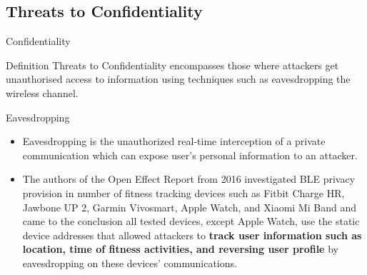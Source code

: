 \documentclass[ucs,9pt]{beamer}
\begin{document}
\subsection{Threats to Confidentiality}

\begin{frame}{Confidentiality}
	\begin{alertblock}{Definition}
	Threats to Confidentiality encompasses those where attackers get unauthorised  access to information using techniques such as eavesdropping  the wireless channel.	
	\end{alertblock}
	
	
	
\end{frame}

\begin{frame}{Eavesdropping}
	\begin{itemize}
		\item Eavesdropping is the unauthorized real-time interception of a private communication which can expose user’s personal information to an attacker.
		\item The authors of the Open Effect Report from 2016 \cite{b7} investigated BLE privacy provision in number of fitness tracking devices such as Fitbit Charge HR, Jawbone UP 2, Garmin Vivosmart, 	Apple Watch, and Xiaomi Mi Band and came to the conclusion all tested devices, except Apple Watch, use the static device addresses that allowed attackers to \textbf{track user information such as location, time of fitness activities, and reversing user profile} by eavesdropping on these devices’ communications.
	\end{itemize}
\end{frame}
\end{document}
